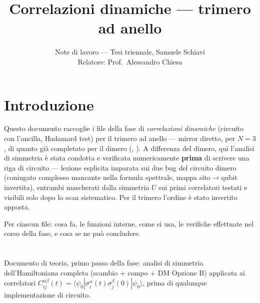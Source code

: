 \documentclass[11pt,a4paper]{article}
\title{Correlazioni dinamiche — trimero ad anello}
\author{Note di lavoro — Tesi triennale, Samuele Schiavi\\ Relatore: Prof.\ Alessandro Chiesa}
\date{}
\begin{document}
\maketitle

\section*{Introduzione}

Questo documento raccoglie i file della fase di \emph{correlazioni dinamiche}
(circuito con l'ancilla, Hadamard test) per il trimero ad anello — mirror diretto,
per $N=3$, di quanto già completato per il dimero
(\texttt{},
\texttt{}). A differenza del dimero,
qui l'analisi di simmetria è stata condotta e verificata numericamente
\textbf{prima} di scrivere una riga di circuito — lezione esplicita imparata sui due
bug del circuito dimero (coniugato complesso mancante nella formula spettrale,
mappa sito$\to$qubit invertita), entrambi mascherati dalla simmetria $U$ sui primi
correlatori testati e visibili solo dopo lo scan sistematico. Per il trimero
l'ordine è stato invertito apposta.

Per ciascun file: cosa fa, le funzioni interne, come si usa, le verifiche
effettuate nel corso della fase, e cosa se ne può concludere.

\section*{\texttt{}}

Documento di teoria, primo passo della fase: analisi di simmetria dell'Hamiltoniana
completa (scambio + campo + DM Opzione B) applicata ai correlatori
$C_{ij}^{\alpha\beta}(t)=\langle\psi_0|\sigma_i^\alpha(t)\sigma_j^\beta(0)|\psi_0\rangle$,
prima di qualunque implementazione di circuito.
\end{document}
